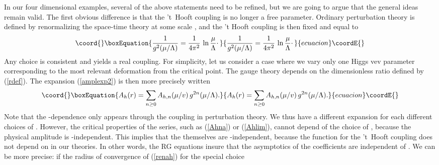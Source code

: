 \documentclass[a4paper,12pt]{article}
\begin{document}
{In our four dimensional examples, several of 
the above statements need to be refined, but we are going to argue that 
the general ideas remain valid. The first obvious difference is that the 
't~Hooft coupling \coordHE{} is no longer a free parameter. 
Ordinary perturbation theory is defined by renormalizing the space-time
theory at some scale \myHighlight{$\mu$}\coordHE{}, and the 't Hooft coupling 
is then fixed and equal to
%
\begin{equation}\coord{}\boxEquation{
\label{RG}
{1\over g^{2}(\mu/\Lambda)} = 
{1\over 4\pi^{2}}\, \ln {\mu\over\Lambda}\cdotp
}{
{1\over g^{2}(\mu/\Lambda)} = 
{1\over 4\pi^{2}}\, \ln {\mu\over\Lambda}\cdotp
}{ecuacion}\coordE{}\end{equation}
%
Any choice \myHighlight{$\mu>\Lambda$}\coordHE{} is consistent and yields a real coupling.
For simplicity, let us consider
a case where we vary only one Higgs vev parameter \coordHE{} corresponding to the
most relevant deformation from the critical point. The gauge theory
depends on the dimensionless ratio \coordHE{} defined by (\ref{rdef}).
The expansion (\ref{amplexp2}) is then more precisely written
%
\begin{equation}\coord{}\boxEquation{
\label{renah}
A_h(r) = \sum_{n\geq 0} A_{h,n}(\mu /v)\, g^{2n}(\mu /\Lambda).
}{
A_h(r) = \sum_{n\geq 0} A_{h,n}(\mu /v)\, g^{2n}(\mu /\Lambda).
}{ecuacion}\coordE{}\end{equation}
%
Note that the \myHighlight{$\Lambda$}\coordHE{}-dependence only appears through the coupling \coordHE{} 
in perturbation theory.
We thus have a different expansion for each different choices of \myHighlight{$\mu$}\coordHE{}. 
However, the critical properties of the series, such as (\ref{Ahna}) or 
(\ref{Ahlim}), cannot depend of the choice of \myHighlight{$\mu$}\coordHE{}, because the physical 
amplitude \coordHE{} is \myHighlight{$\mu$}\coordHE{}-independent. This implies that the 
\coordHE{} themselves are \myHighlight{$\mu$}\coordHE{}-independent, because the \myHighlight{$\beta$}\coordHE{} function 
for the 't~Hooft coupling does not depend on \coordHE{} in our theories. In other 
words, the RG equations insure that the \coordHE{} asymptotics 
of the coefficients \coordHE{} are independent of \myHighlight{$\mu$}\coordHE{}. We can be 
more precise: if the radius of convergence of (\ref{renah}) for the 
special choice \coordHE{} 
}
\end{document}
